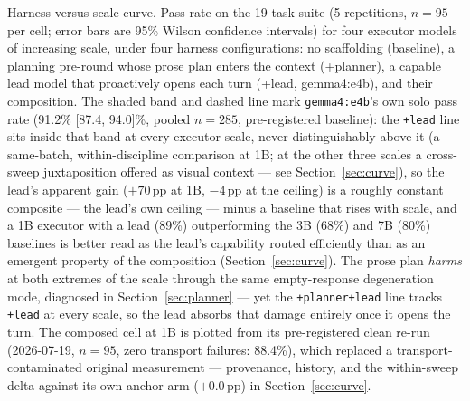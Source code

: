 \caption{Harness-versus-scale curve. Pass rate on the 19-task suite
(5 repetitions, $n{=}95$ per cell; error bars are 95\% Wilson
confidence intervals) for four
executor models of increasing scale, under four harness
configurations: no scaffolding (baseline), a planning pre-round whose
prose plan enters the context (+planner), a capable lead model that
proactively opens each turn (+lead, gemma4:e4b), and their
composition. The shaded band and dashed line
mark \texttt{gemma4:e4b}'s own solo pass rate (91.2\% [87.4, 94.0]\%,
pooled $n{=}285$, pre-registered baseline): the \texttt{+lead} line
sits inside that band at every executor scale, never distinguishably
above it (a same-batch, within-discipline comparison at 1B; at the
other three scales a cross-sweep juxtaposition offered as visual
context --- see Section~\ref{sec:curve}), so the lead's apparent gain
($+70$\,pp at 1B, $-4$\,pp at
the ceiling) is a roughly constant composite --- the lead's own
ceiling --- minus a baseline that rises with scale, and a 1B executor
with a lead (89\%) outperforming the 3B (68\%) and 7B (80\%) baselines
is better read as the lead's capability routed efficiently than as an
emergent property of the composition
(Section~\ref{sec:curve}). The prose plan \emph{harms} at both
extremes of the scale through the same empty-response degeneration
mode, diagnosed in Section~\ref{sec:planner} --- yet the
\texttt{+planner+lead} line tracks \texttt{+lead} at every scale, so
the lead absorbs that damage entirely once it opens the turn. The
composed cell at 1B is plotted from its pre-registered clean re-run
(2026-07-19, $n{=}95$, zero transport failures: 88.4\%), which
replaced a transport-contaminated original measurement --- provenance,
history, and the within-sweep delta against its own anchor arm
($+0.0$\,pp) in Section~\ref{sec:curve}.}
